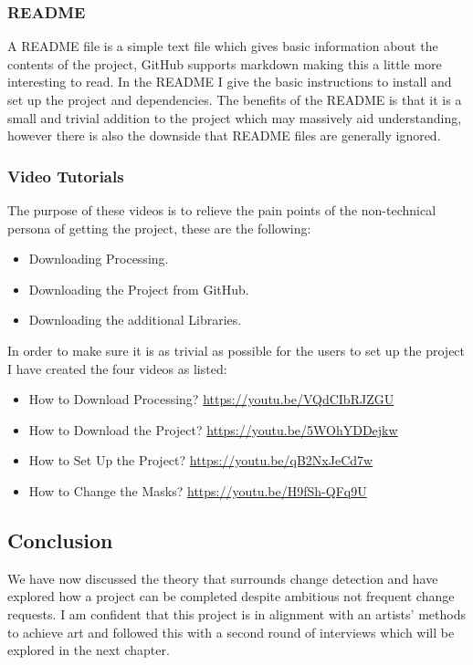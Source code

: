 \documentclass[a4paper]{report}
\begin{document}
\subsubsection{README}
A README file is a simple text file which gives basic information about the contents of the project, GitHub supports markdown making this a little more interesting to read. In the README I give the basic instructions to install and set up the project and dependencies. The benefits of the README is that it is a small and trivial addition to the project which may massively aid understanding, however there is also the downside that README files are generally ignored.

\subsubsection{Video Tutorials}
The purpose of these videos is to relieve the pain points of the non-technical persona of getting the project, these are the following:

\begin{itemize}
\item Downloading Processing.
\item Downloading the Project from GitHub.
\item Downloading the additional Libraries.
\end{itemize}

In order to make sure it is as trivial as possible for the users to set up the project I have created the four videos as listed:

\begin{itemize}
\item How to Download Processing? \url{https://youtu.be/VQdCIbRJZGU}
\item How to Download the Project? \url{https://youtu.be/5WOhYDDejkw}
\item How to Set Up the Project? \url{https://youtu.be/qB2NxJeCd7w}
\item How to Change the Masks? \url{https://youtu.be/H9fSh-QFq9U}
\end{itemize}

\subsection{Conclusion}
We have now discussed the theory that surrounds change detection and have explored how a project can be completed despite ambitious not frequent change requests. I am confident that this project is in alignment with an artists' methods to achieve art and followed this with a second round of interviews which will be explored in the next chapter.
\end{document}
